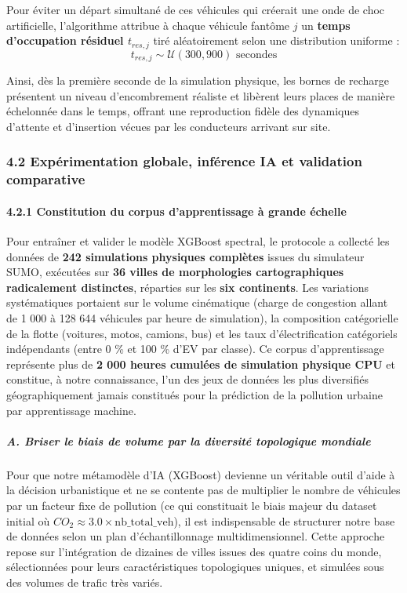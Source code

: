 \documentclass[10pt, a4paper]{article}
\begin{document}
Pour éviter un départ simultané de ces véhicules qui créerait une onde
de choc artificielle, l'algorithme attribue à chaque véhicule fantôme
\(j\) un \textbf{temps d'occupation résiduel \(t_{res, j}\)} tiré
aléatoirement selon une distribution uniforme :
\[t_{res, j} \sim \mathcal{U}(300, 900) \text{ secondes}\]

Ainsi, dès la première seconde de la simulation physique, les bornes de
recharge présentent un niveau d'encombrement réaliste et libèrent leurs
places de manière échelonnée dans le temps, offrant une reproduction
fidèle des dynamiques d'attente et d'insertion vécues par les
conducteurs arrivant sur site.

\subsubsection{4.2 Expérimentation globale, inférence IA et validation
comparative}\label{expuxe9rimentation-globale-infuxe9rence-ia-et-validation-comparative}

\paragraph{4.2.1 Constitution du corpus d'apprentissage à grande
échelle}\label{constitution-du-corpus-dapprentissage-uxe0-grande-uxe9chelle}

Pour entraîner et valider le modèle XGBoost spectral, le protocole a
collecté les données de \textbf{242 simulations physiques complètes}
issues du simulateur SUMO, exécutées sur \textbf{36 villes de
morphologies cartographiques radicalement distinctes}, réparties sur les
\textbf{six continents}. Les variations systématiques portaient sur le
volume cinématique (charge de congestion allant de 1 000 à 128 644
véhicules par heure de simulation), la composition catégorielle de la
flotte (voitures, motos, camions, bus) et les taux d'électrification
catégoriels indépendants (entre 0 \% et 100 \% d'EV par classe). Ce
corpus d'apprentissage représente plus de \textbf{2 000 heures cumulées
de simulation physique CPU} et constitue, à notre connaissance, l'un des
jeux de données les plus diversifiés géographiquement jamais constitués
pour la prédiction de la pollution urbaine par apprentissage machine.

\subparagraph{A. Briser le biais de volume par la diversité topologique
mondiale}\label{a.-briser-le-biais-de-volume-par-la-diversituxe9-topologique-mondiale}

Pour que notre métamodèle d'IA (XGBoost) devienne un véritable outil
d'aide à la décision urbanistique et ne se contente pas de multiplier le
nombre de véhicules par un facteur fixe de pollution (ce qui constituait
le biais majeur du dataset initial où
\(CO_2 \approx 3.0 \times \text{nb\_total\_veh}\)), il est indispensable
de structurer notre base de données selon un plan d'échantillonnage
multidimensionnel. Cette approche repose sur l'intégration de dizaines
de villes issues des quatre coins du monde, sélectionnées pour leurs
caractéristiques topologiques uniques, et simulées sous des volumes de
trafic très variés.
\end{document}
